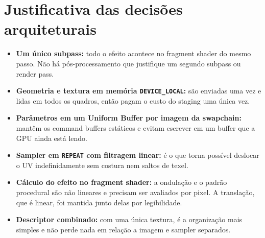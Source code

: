 \section{Justificativa das decisões arquiteturais}

\begin{itemize}
    \item \textbf{Um único subpass:} todo o efeito acontece no fragment shader do mesmo passo. Não há pós-processamento que justifique um segundo subpass ou render pass.
    \item \textbf{Geometria e textura em memória \texttt{DEVICE\_LOCAL}:} são enviadas uma vez e lidas em todos os quadros, então pagam o custo do staging uma única vez.
    \item \textbf{Parâmetros em um Uniform Buffer por imagem da swapchain:} mantêm os command buffers estáticos e evitam escrever em um buffer que a GPU ainda está lendo.
    \item \textbf{Sampler em \texttt{REPEAT} com filtragem linear:} é o que torna possível deslocar o UV indefinidamente sem costura nem saltos de texel.
    \item \textbf{Cálculo do efeito no fragment shader:} a ondulação e o padrão procedural são não lineares e precisam ser avaliados por pixel. A translação, que é linear, foi mantida junto delas por legibilidade.
    \item \textbf{Descriptor combinado:} com uma única textura, é a organização mais simples e não perde nada em relação a imagem e sampler separados.
\end{itemize}
